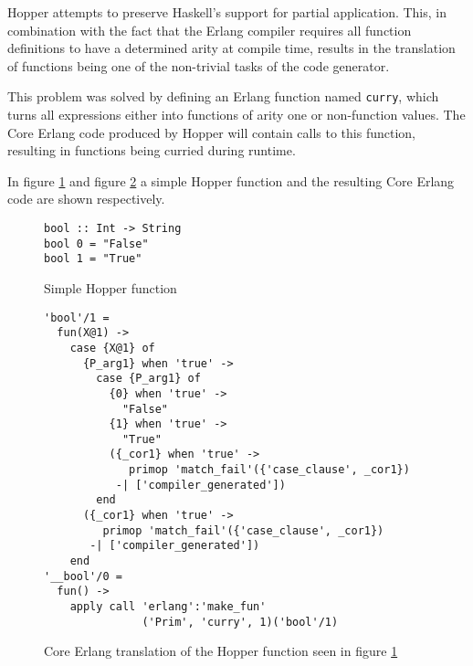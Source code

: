 Hopper attempts to preserve Haskell's support for partial application. This, in combination with the fact that the Erlang compiler requires all function definitions to have a determined \gls{arity} at compile time, results in the translation of functions being one of the non-trivial tasks of the code generator.

This problem was solved by defining an Erlang function named \texttt{curry}, which turns all expressions either into functions of \gls{arity} one or non-function values. The Core Erlang code produced by Hopper will contain calls to this function, resulting in functions being curried during runtime.

In figure \ref{lst:hopperFun} and figure \ref{lst:coreFun} a simple Hopper function and the resulting Core Erlang code are shown respectively.

\begin{figure}[!htb]
\centering
\begin{minipage}[b]{0.38\linewidth}
\centering
\begin{lstlisting}
bool :: Int -> String
bool 0 = "False"
bool 1 = "True"
\end{lstlisting}
\end{minipage}
\caption{Simple Hopper function}
\label{lst:hopperFun}
\end{figure}

\begin{figure}[!htb]
\centering
\begin{lstlisting}
'bool'/1 =
  fun(X@1) ->
    case {X@1} of
      {P_arg1} when 'true' ->
        case {P_arg1} of
          {0} when 'true' ->
            "False"
          {1} when 'true' ->
            "True"
          ({_cor1} when 'true' ->
             primop 'match_fail'({'case_clause', _cor1})
           -| ['compiler_generated'])
        end
      ({_cor1} when 'true' ->
         primop 'match_fail'({'case_clause', _cor1})
       -| ['compiler_generated'])
    end
'__bool'/0 =
  fun() ->
    apply call 'erlang':'make_fun'
               ('Prim', 'curry', 1)('bool'/1)
\end{lstlisting}
\caption[Generated Core Erlang translation of function]
 {Core Erlang translation of the Hopper function seen in figure \ref{lst:hopperFun}}
\label{lst:coreFun}
\end{figure}

